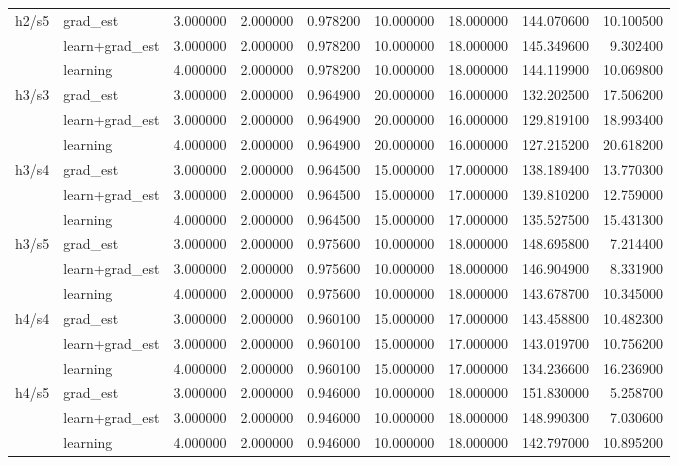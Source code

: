 \begin{tabular}{llllrrrrr}
\multirow[t]{3}{*}{h2/s5} & grad_est & 3.000000 & 2.000000 & 0.978200 & 10.000000 & 18.000000 & 144.070600 & 10.100500 \\
\cline{2-9} \cline{3-9}
 & learn+grad_est & 3.000000 & 2.000000 & 0.978200 & 10.000000 & 18.000000 & 145.349600 & 9.302400 \\
\cline{2-9} \cline{3-9}
 & learning & 4.000000 & 2.000000 & 0.978200 & 10.000000 & 18.000000 & 144.119900 & 10.069800 \\
\cline{1-9} \cline{2-9} \cline{3-9}
\multirow[t]{3}{*}{h3/s3} & grad_est & 3.000000 & 2.000000 & 0.964900 & 20.000000 & 16.000000 & 132.202500 & 17.506200 \\
\cline{2-9} \cline{3-9}
 & learn+grad_est & 3.000000 & 2.000000 & 0.964900 & 20.000000 & 16.000000 & 129.819100 & 18.993400 \\
\cline{2-9} \cline{3-9}
 & learning & 4.000000 & 2.000000 & 0.964900 & 20.000000 & 16.000000 & 127.215200 & 20.618200 \\
\cline{1-9} \cline{2-9} \cline{3-9}
\multirow[t]{3}{*}{h3/s4} & grad_est & 3.000000 & 2.000000 & 0.964500 & 15.000000 & 17.000000 & 138.189400 & 13.770300 \\
\cline{2-9} \cline{3-9}
 & learn+grad_est & 3.000000 & 2.000000 & 0.964500 & 15.000000 & 17.000000 & 139.810200 & 12.759000 \\
\cline{2-9} \cline{3-9}
 & learning & 4.000000 & 2.000000 & 0.964500 & 15.000000 & 17.000000 & 135.527500 & 15.431300 \\
\cline{1-9} \cline{2-9} \cline{3-9}
\multirow[t]{3}{*}{h3/s5} & grad_est & 3.000000 & 2.000000 & 0.975600 & 10.000000 & 18.000000 & 148.695800 & 7.214400 \\
\cline{2-9} \cline{3-9}
 & learn+grad_est & 3.000000 & 2.000000 & 0.975600 & 10.000000 & 18.000000 & 146.904900 & 8.331900 \\
\cline{2-9} \cline{3-9}
 & learning & 4.000000 & 2.000000 & 0.975600 & 10.000000 & 18.000000 & 143.678700 & 10.345000 \\
\cline{1-9} \cline{2-9} \cline{3-9}
\multirow[t]{3}{*}{h4/s4} & grad_est & 3.000000 & 2.000000 & 0.960100 & 15.000000 & 17.000000 & 143.458800 & 10.482300 \\
\cline{2-9} \cline{3-9}
 & learn+grad_est & 3.000000 & 2.000000 & 0.960100 & 15.000000 & 17.000000 & 143.019700 & 10.756200 \\
\cline{2-9} \cline{3-9}
 & learning & 4.000000 & 2.000000 & 0.960100 & 15.000000 & 17.000000 & 134.236600 & 16.236900 \\
\cline{1-9} \cline{2-9} \cline{3-9}
\multirow[t]{3}{*}{h4/s5} & grad_est & 3.000000 & 2.000000 & 0.946000 & 10.000000 & 18.000000 & 151.830000 & 5.258700 \\
\cline{2-9} \cline{3-9}
 & learn+grad_est & 3.000000 & 2.000000 & 0.946000 & 10.000000 & 18.000000 & 148.990300 & 7.030600 \\
\cline{2-9} \cline{3-9}
 & learning & 4.000000 & 2.000000 & 0.946000 & 10.000000 & 18.000000 & 142.797000 & 10.895200 \\
\cline{1-9} \cline{2-9} \cline{3-9}
\bottomrule
\end{tabular}
